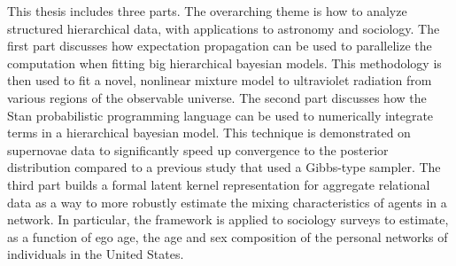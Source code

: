 
This thesis includes three parts. The overarching theme is how to analyze structured hierarchical data, with applications to astronomy and sociology. The first part discusses how expectation propagation can be used to parallelize the computation when fitting big hierarchical bayesian models. This methodology is then used to fit a novel, nonlinear mixture model to ultraviolet radiation from various regions of the observable universe. The second part discusses how the Stan probabilistic programming language can be used to numerically integrate terms in a hierarchical bayesian model. This technique is demonstrated on supernovae data to significantly speed up convergence to the posterior distribution compared to a previous study that used a Gibbs-type sampler. The third part builds a formal latent kernel representation for aggregate relational data as a way to more robustly estimate the mixing characteristics of agents in a network. In particular, the framework is applied to sociology surveys to estimate, as a function of ego age, the age and sex composition of the personal networks of individuals in the United States.
